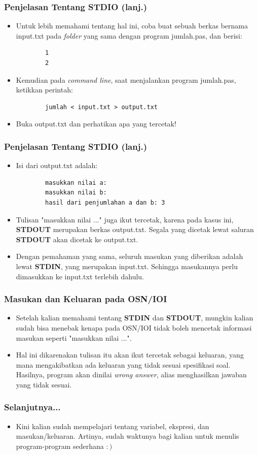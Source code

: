 \documentclass{beamer}
\begin{document}
\begin{frame}[fragile]
\frametitle{Penjelasan Tentang STDIO (lanj.)}
\begin{itemize}
	\item Untuk lebih memahami tentang hal ini, coba buat sebuah berkas bernama input.txt pada \textit{folder} yang sama dengan program jumlah.pas, dan berisi:
	\begin{lstlisting}
		1
		2
	\end{lstlisting}
	\item Kemudian pada \textit{command line}, saat menjalankan program jumlah.pas, ketikkan perintah:
	\begin{lstlisting}
		jumlah < input.txt > output.txt
	\end{lstlisting}
	\item Buka output.txt dan perhatikan apa yang tercetak!
\end{itemize}
\end{frame}

\begin{frame}[fragile]
\frametitle{Penjelasan Tentang STDIO (lanj.)}
\begin{itemize}
	\item Isi dari output.txt adalah:
	\begin{lstlisting}
		masukkan nilai a: 
		masukkan nilai b: 
		hasil dari penjumlahan a dan b: 3
	\end{lstlisting}
	\item Tulisan "masukkan nilai ..." juga ikut tercetak, karena pada kasus ini, \textbf{STDOUT} merupakan berkas output.txt. Segala yang dicetak lewat saluran \textbf{STDOUT} akan dicetak ke output.txt.
	\item Dengan pemahaman yang sama, seluruh masukan yang diberikan adalah lewat \textbf{STDIN}, yang merupakan input.txt. Sehingga masukannya perlu dimasukkan ke input.txt terlebih dahulu.
\end{itemize}
\end{frame}

\begin{frame}
\frametitle{Masukan dan Keluaran pada OSN/IOI}
\begin{itemize}
	\item Setelah kalian memahami tentang \textbf{STDIN} dan \textbf{STDOUT}, mungkin kalian sudah bisa menebak kenapa pada OSN/IOI tidak boleh mencetak informasi masukan seperti "masukkan nilai ...".
	\item Hal ini dikarenakan tulisan itu akan ikut tercetak sebagai keluaran, yang mana mengakibatkan ada keluaran yang tidak sesuai spesifikasi soal. Hasilnya, program akan dinilai \alert{\textit{wrong answer}}, alias menghasilkan jawaban yang tidak sesuai. 
\end{itemize}
\end{frame}

\begin{frame}
\frametitle{Selanjutnya...}
\begin{itemize}
	\item Kini kalian sudah mempelajari tentang variabel, ekspresi, dan masukan/keluaran. Artinya, sudah waktunya bagi kalian untuk menulis program-program sederhana $:)$
\end{itemize}
\end{frame}
\end{document}
